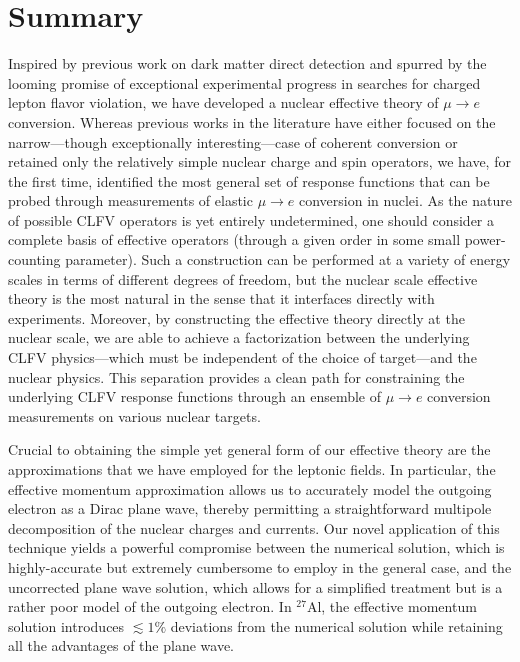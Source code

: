 \documentclass[12pt,letterpaper]{book}
\begin{document}
\section{Summary}
Inspired by previous work on dark matter direct detection and spurred by the looming promise of exceptional experimental progress in searches for charged lepton flavor violation, we have developed a nuclear effective theory of $\mu\rightarrow e$ conversion. Whereas previous works in the literature have either focused on the narrow---though exceptionally interesting---case of coherent conversion or retained only the relatively simple nuclear charge and spin operators, we have, for the first time, identified the most general set of response functions that can be probed through measurements of elastic $\mu\rightarrow e$ conversion in nuclei. As the nature of possible CLFV operators is yet entirely undetermined, one should consider a complete basis of effective operators (through a given order in some small power-counting parameter). Such a construction can be performed at a variety of energy scales in terms of different degrees of freedom, but the nuclear scale effective theory is the most natural in the sense that it interfaces directly with experiments. Moreover, by constructing the effective theory directly at the nuclear scale, we are able to achieve a factorization between the underlying CLFV physics---which must be independent of the choice of target---and the nuclear physics. This separation provides a clean path for constraining the underlying CLFV response functions through an ensemble of $\mu\rightarrow e$ conversion measurements on various nuclear targets. 

Crucial to obtaining the simple yet general form of our effective theory are the approximations that we have employed for the leptonic fields. In particular, the effective momentum approximation allows us to accurately model the outgoing electron as a Dirac plane wave, thereby permitting a straightforward multipole decomposition of the nuclear charges and currents. Our novel application of this technique yields a powerful compromise between the numerical solution, which is highly-accurate but extremely cumbersome to employ in the general case, and the uncorrected plane wave solution, which allows for a simplified treatment but is a rather poor model of the outgoing electron. In $^{27}$Al, the effective momentum solution introduces $\lesssim 1\%$ deviations from the numerical solution while retaining all the advantages of the plane wave.
\end{document}
